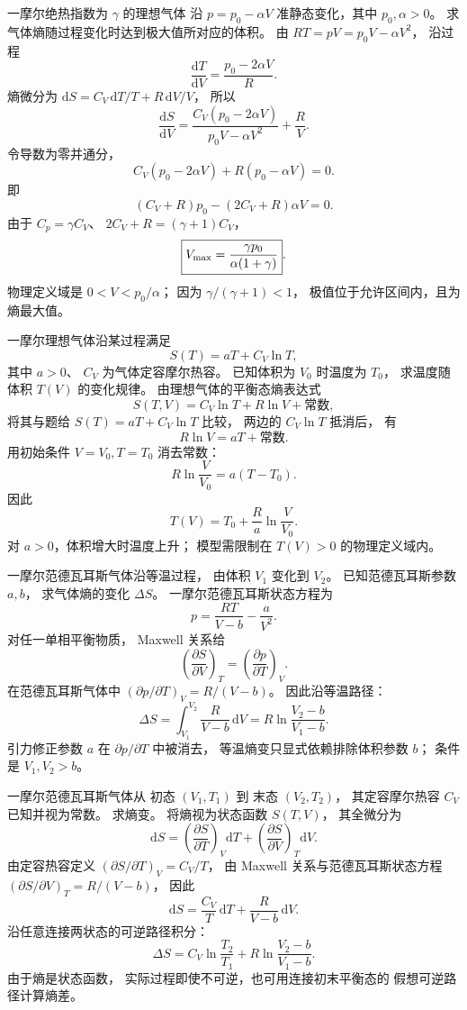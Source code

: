一摩尔绝热指数为 $\gamma$ 的理想气体
沿 $p=p_0-\alpha V$
准静态变化，其中 $p_0,\alpha>0$。
求气体熵随过程变化时达到极大值所对应的体积。
\exsolution
由
$RT=pV=p_0V-\alpha V^2$，
沿过程
\[
\frac{\mathrm dT}{\mathrm dV}
=\frac{p_0-2\alpha V}{R}.
\]
熵微分为
$\mathrm dS=C_V\,\mathrm dT/T+
R\,\mathrm dV/V$，
所以
\[
\frac{\mathrm dS}{\mathrm dV}
=\frac{C_V(p_0-2\alpha V)}
{p_0V-\alpha V^2}+\frac R V.
\]
令导数为零并通分，
\[
C_V(p_0-2\alpha V)+R(p_0-\alpha V)=0.
\]
即
\[
(C_V+R)p_0-(2C_V+R)\alpha V=0.
\]
由于 $C_p=\gamma C_V$、
$2C_V+R=(\gamma+1)C_V$，
\[
\boxed{V_{\rm max}=\frac{\gamma p_0}{\alpha(1+\gamma)}}.
\]
\excheck 物理定义域是
$0<V<p_0/\alpha$；
因为 $\gamma/(\gamma+1)<1$，
极值位于允许区间内，且为熵最大值。

一摩尔理想气体沿某过程满足
\[
S(T)=aT+C_V\ln T,
\]
其中 $a>0$、
$C_V$ 为气体定容摩尔热容。
已知体积为 $V_0$ 时温度为 $T_0$，
求温度随体积 $T(V)$ 的变化规律。
\exsolution
由理想气体的平衡态熵表达式
\[
S(T,V)=C_V\ln T+R\ln V+\text{常数},
\]
将其与题给 $S(T)=aT+C_V\ln T$ 比较，
两边的 $C_V\ln T$ 抵消后，
有
\[
R\ln V=aT+\text{常数}.
\]
用初始条件 $V=V_0,T=T_0$ 消去常数：
\[
R\ln\frac V{V_0}=a(T-T_0).
\]
因此
\[
\boxed{T(V)=T_0+\frac Ra\ln\frac V{V_0}}.
\]
\excheck 对 $a>0$，体积增大时温度上升；
模型需限制在 $T(V)>0$ 的物理定义域内。

一摩尔范德瓦耳斯气体沿等温过程，
由体积 $V_1$ 变化到 $V_2$。
已知范德瓦耳斯参数 $a,b$，
求气体熵的变化 $\Delta S$。
\exsolution
一摩尔范德瓦耳斯状态方程为
\[
p=\frac{RT}{V-b}-\frac a{V^2}.
\]
对任一单相平衡物质，
Maxwell 关系给
\[
\left(\frac{\partial S}{\partial V}\right)_T
=\left(\frac{\partial p}{\partial T}\right)_V.
\]
在范德瓦耳斯气体中
$(\partial p/\partial T)_V=R/(V-b)$。
因此沿等温路径：
\[
\Delta S=\int_{V_1}^{V_2}
\frac R{V-b}\,\mathrm dV
=\boxed{R\ln\frac{V_2-b}{V_1-b}}.
\]
\excheck 引力修正参数 $a$ 在
$\partial p/\partial T$ 中被消去，
等温熵变只显式依赖排除体积参数 $b$；
条件是 $V_1,V_2>b$。

一摩尔范德瓦耳斯气体从
初态 $(V_1,T_1)$ 到
末态 $(V_2,T_2)$，
其定容摩尔热容 $C_V$ 已知并视为常数。
求熵变。
\exsolution
将熵视为状态函数 $S(T,V)$，
其全微分为
\[
\mathrm dS=
\left(\frac{\partial S}{\partial T}\right)_V\mathrm dT+
\left(\frac{\partial S}{\partial V}\right)_T\mathrm dV.
\]
由定容热容定义
$(\partial S/\partial T)_V=C_V/T$，
由 Maxwell 关系与范德瓦耳斯状态方程
$(\partial S/\partial V)_T=R/(V-b)$，
因此
\[
\mathrm dS=\frac{C_V}{T}\,\mathrm dT+
\frac R{V-b}\,\mathrm dV.
\]
沿任意连接两状态的可逆路径积分：
\[
\boxed{\Delta S=C_V\ln\frac{T_2}{T_1}
+R\ln\frac{V_2-b}{V_1-b}}.
\]
\excheck 由于熵是状态函数，
实际过程即使不可逆，也可用连接初末平衡态的
假想可逆路径计算熵差。

